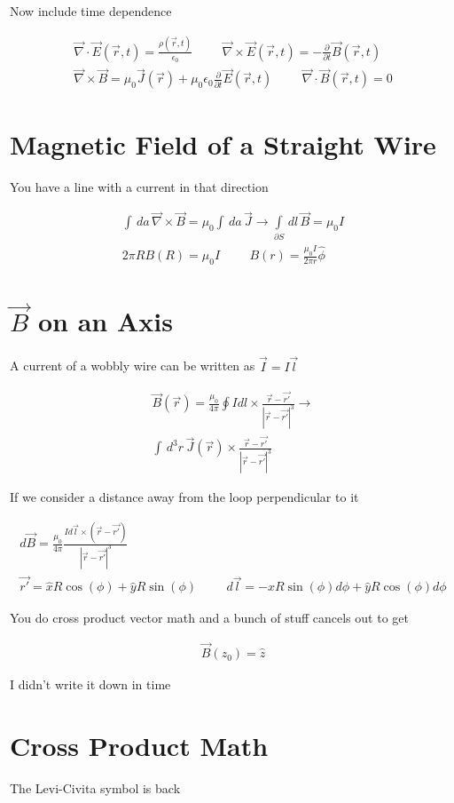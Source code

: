 \documentclass[fleqn]{report}
\newcommand{\hp}{\hspace{1cm}}
\newcommand{\del}{\partial}
\newcommand{\equations} [1] {
\begin{gather*}
#1
\end{gather*}
}
\begin{document}
Now include time dependence 

\equations{
    \vec \nabla \cdot \vec E(\vec r, t) = \frac{\rho(\vec r, t)}{\epsilon_0}
    \hp 
    \vec \nabla \times \vec E(\vec r, t) = - \frac{\del}{\del t} \vec B(\vec r, t)
    \\
    \vec \nabla \times \vec B
    =
    \mu_0 \vec J(\vec r)
    +
    \mu_0 \epsilon_0 \frac{\del}{\del t} \vec E(\vec r, t)
    \hp
    \vec \nabla \cdot \vec B(\vec r, t) = 0
}

\section{Magnetic Field of a Straight Wire}
You have a line with a current in that direction 

\equations{
    \int \, da \, \vec \nabla \times \vec B 
    =
    \mu_0 \int \, da \, \vec J 
    \rightarrow 
    \int\limits_{\del S} \, dl \, \vec B 
    = \mu_0 I 
    \\
    2 \pi R B(R) = \mu_0 I 
    \hp 
    B(r) = \frac{\mu_0 I}{2 \pi r} \hat \phi 
}

\section{$\vec B$ on an Axis}
A current of a wobbly wire can be written as $\vec I = I \vec l$
\equations{
    \vec B(\vec r) = \frac{\mu_0}{4 \pi}
    \oint I d l \times \frac{\vec r - \vec{r'}}{|\vec r - \vec{r'}|^3}
    \rightarrow 
    \\
    \int \, d^3 r \, \vec J(\vec r) \times \frac{\vec r - \vec{r'}}{|\vec r - \vec{r'}|^3}
}

If we consider a distance away from the loop perpendicular to it 

\equations{
    d \vec B 
    =
    \frac{\mu_0}{4 \pi}
    \frac{ I d \vec l \times (\vec r - \vec{r'}) }
    { |\vec r - \vec{r'}|^3 }
    \\
    \vec{r'} = \hat x R \cos(\phi) + \hat y R \sin(\phi)
    \hp 
    d \vec l 
    =
    -\hat x R \sin(\phi) d \phi + \hat y R \cos(\phi) d \phi 
}

You do cross product vector math and a bunch of stuff cancels out to get 

\equations{
    \vec B(z_0) = \hat z 
}
I didn't write it down in time 

\section{Cross Product Math}
The Levi-Civita symbol is back 
\end{document}
